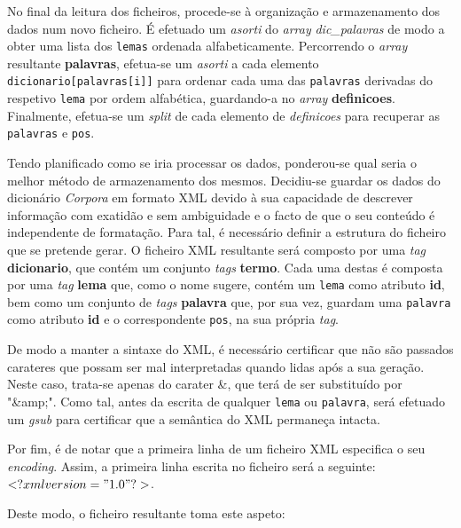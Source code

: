 \documentclass[a4paper]{article}
\begin{document}
\par No final da leitura dos ficheiros, procede-se à organização e armazenamento dos dados num novo ficheiro. É efetuado um \textit{asorti} do \textit{array} \textit{dic\_palavras} de modo a obter uma lista dos \texttt{lemas} ordenada alfabeticamente. Percorrendo o \textit{array} resultante \textbf{palavras}, efetua-se um \textit{asorti} a cada elemento \texttt{dicionario[palavras[i]]} para ordenar cada uma das \texttt{palavras} derivadas do respetivo \texttt{lema} por ordem alfabética, guardando-a no \textit{array} \textbf{definicoes}. Finalmente, efetua-se um \textit{split} de cada elemento de \textit{definicoes} para recuperar as \texttt{palavras} e \texttt{pos}.

\par Tendo planificado como se iria processar os dados, ponderou-se qual seria o melhor método de armazenamento dos mesmos. Decidiu-se guardar os dados do dicionário \textit{Corpora} em formato XML devido à sua capacidade de descrever informação com exatidão e sem ambiguidade e o facto de que o seu conteúdo é independente de formatação. Para tal, é necessário definir a estrutura do ficheiro que se pretende gerar. O ficheiro XML resultante será composto por uma \textit{tag} \textbf{dicionario}, que contém um conjunto \textit{tags} \textbf{termo}. Cada uma destas é composta por uma \textit{tag} \textbf{lema} que, como o nome sugere, contém um \texttt{lema} como atributo \textbf{id}, bem como um conjunto de \textit{tags} \textbf{palavra} que, por sua vez, guardam uma \texttt{palavra} como atributo \textbf{id} e o correspondente \texttt{pos}, na sua própria \textit{tag}.

\par De modo a manter a sintaxe do XML, é necessário certificar que não são passados carateres que possam ser mal interpretadas quando lidas após a sua geração. Neste caso, trata-se apenas do carater \&, que terá de ser substituído por "\&amp;". Como tal, antes da escrita de qualquer \texttt{lema} ou \texttt{palavra}, será efetuado um \textit{gsub} para certificar que a semântica do XML permaneça intacta.

\par Por fim, é de notar que a primeira linha de um ficheiro XML especifica o seu \textit{encoding}. Assim, a primeira linha escrita no ficheiro será a seguinte: \( <?xml version="1.0" ?> \).


\par Deste modo, o ficheiro resultante toma este aspeto:
\end{document}
